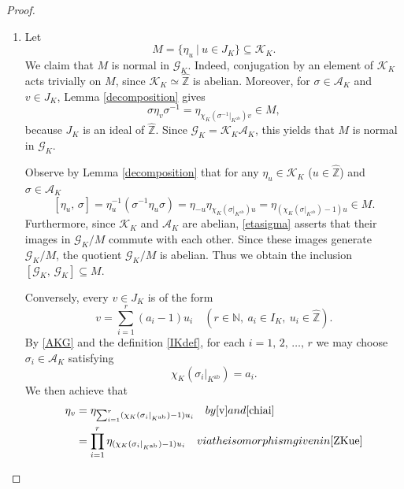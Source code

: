 \documentclass[10pt,a4paper]{amsart}
\begin{document}
\begin{proof}
\begin{enumerate}
\item[(i)]
Let
\begin{equation*}
M=\{\eta_u~|~u\in J_K\}\subseteq\mathcal{K}_K.
\end{equation*}
We claim that $M$ is normal in $\mathcal{G}_K$. Indeed, conjugation by
an element of $\mathcal K_K$ acts trivially on $M$, since
$\mathcal K_K\simeq\widehat{\mathbb{Z}}$ is abelian. Moreover, for
$\sigma\in\mathcal{A}_K$ and $v\in J_K$, Lemma \ref{decomposition} gives
\begin{equation*}
\sigma\eta_v\sigma^{-1}=
\eta_{\chi_K(\sigma^{-1}|_{K^\mathrm{ab}})\textstyle v}\in M,
\end{equation*}
because $J_K$ is an ideal of $\widehat{\mathbb Z}$.
Since $\mathcal{G}_K=\mathcal{K}_K\mathcal{A}_K$, this yields that
$M$ is normal in $\mathcal{G}_K$. 
\par
Observe by Lemma \ref{decomposition} that
for any $\eta_u\in\mathcal{K}_K$ ($u\in\widehat{\mathbb{Z}}$) and $\sigma\in\mathcal{A}_K$
\begin{equation}\label{etasigma}
[\eta_u,\,\sigma]=\eta_u^{-1}\left(\sigma^{-1}\eta_u\sigma\right)
=\eta_{-u}\eta_{\chi_K(\sigma|_{K^\mathrm{ab}})u}
=\eta_{\left(\chi_K(\sigma|_{K^\mathrm{ab}})-1\right)u}\in M.
\end{equation}
Furthermore, since $\mathcal{K}_K$ and $\mathcal{A}_K$ are abelian, \eqref{etasigma}
asserts that
their images in $\mathcal{G}_K/M$ commute with each other.
Since these images generate $\mathcal{G}_K/M$, the quotient $\mathcal{G}_K/M$ is
abelian. Thus we obtain the inclusion
$[\mathcal{G}_K,\,\mathcal{G}_K]\subseteq M$.
\par
Conversely, every $v\in J_K$ is of the form
\begin{equation}\label{v}
v=\sum_{i=1}^r(a_i-1)u_i
\quad(r\in\mathbb{N},~a_i\in I_K,~u_i\in\widehat{\mathbb{Z}}).
\end{equation}
By \eqref{AKG} and the definition \eqref{IKdef}, for each $i=1,\,2,\,\ldots,\,r$ we may choose
$\sigma_i\in\mathcal{A}_K$ satisfying
\begin{equation}\label{chiai}
\chi_K(\sigma_i|_{K^\mathrm{ab}})=a_i.
\end{equation}
We then achieve that
\begin{align*}
\eta_v&=\eta_{\sum_{i=1}^r(\chi_K(\sigma_i|_{K^\mathrm{ab}})-1)u_i}\quad\textrm{by 
\eqref{v} and \eqref{chiai}}\\
&=\prod_{i=1}^r\eta_{(\chi_K(\sigma_i|_{K^\mathrm{ab}})-1)u_i}\quad\textrm{via the isomorphism given in \eqref{ZKue}}\\

\end{align*}
\end{enumerate}
\end{proof}
\end{document}
